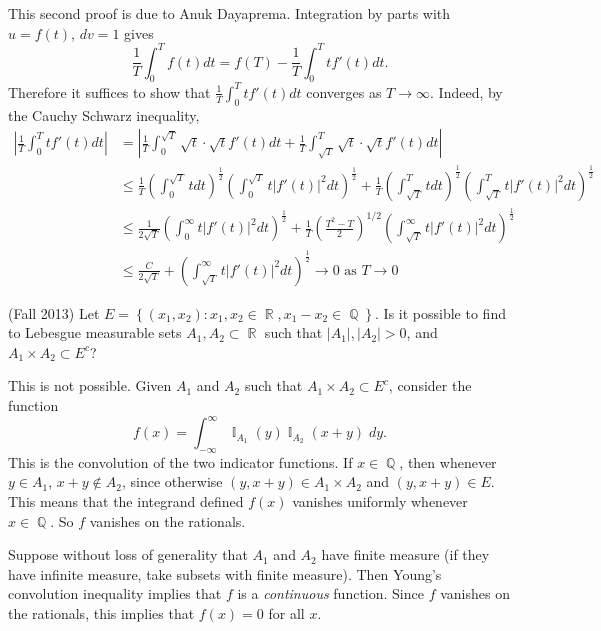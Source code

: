 \documentclass[answers]{exam}
\DeclareMathOperator{\RR}{\mathbb{R}}
\DeclareMathOperator{\QQ}{\mathbb{Q}}
\DeclareMathOperator{\II}{\mathbb{I}}
\begin{document}
\begin{questions}
\begin{solution}
    This second proof is due to Anuk Dayaprema. Integration by parts with $u=f(t)$, $dv=1$ gives
\begin{equation*}
  \frac{1}{T}\int_{0}^{T}f(t)dt = f(T) - \frac{1}{T}\int_{0}^{T}tf'(t)dt.
\end{equation*}
Therefore it suffices to show that $\frac{1}{T}\int_{0}^{T}tf'(t)dt$ converges as $T\to \infty$. Indeed, by the Cauchy Schwarz inequality,
\begin{align*}
  \left|\frac{1}{T}\int_{0}^{T}tf'(t)dt\right|
  &= \left|\frac{1}{T}\int_{0}^{\sqrt{T}}\sqrt{t}\cdot\sqrt{t}f'(t)dt + \frac{1}{T}\int_{\sqrt{T}}^{T}\sqrt{t}\cdot \sqrt{t}f'(t)dt\right|\\
  & \leq \frac{1}{T}\left(\int_{0}^{\sqrt{T}}t dt \right)^{\frac{1}{2}}\left( \int_{0}^{\sqrt{T}}t |f'(t)|^{2}dt \right)^{\frac{1}{2}}+ \frac{1}{T}\left( \int_{\sqrt{T}}^{T}tdt \right)^{\frac{1}{2}}\left( \int_{\sqrt{T}}^{T}t|f'(t)|^{2}dt \right)^{\frac{1}{2}}\\
  &\leq \frac{1}{2 \sqrt{T}} \left(\int_{0}^{\infty}t|f'(t)|^{2} dt \right)^{\frac{1}{2}} + \frac{1}{T}\left( \frac{T^{2}-T}{2} \right)^{1/2}\left(\int_{\sqrt{T}}^{\infty}t|f'(t)|^{2}dt \right)^{\frac{1}{2}}\\
  &\leq \frac{C}{2 \sqrt{T}}  +\left(\int_{\sqrt{T}}^{\infty} t|f'(t)|^{2}dt \right)^{\frac{1}{2}} \to 0 \text{ as }T\to 0
\end{align*}
\end{solution}



\question (Fall 2013) Let $E= \left\{ (x_{1},x_{2}) : x_{1},x_{2}\in \RR, x_{1}-x_{2}\in \QQ\right\}$. Is it possible to find to Lebesgue measurable sets $A_{1},A_{2}\subset\RR$ such that $|A_{1}|,|A_{2}|>0$, and $A_{1}\times A_{2}\subset E^{c}$?
\begin{solution}
	This is not possible. Given $A_1$ and $A_2$ such that $A_1 \times A_2 \subset E^c$, consider the function
	\[ f(x) = \int_{-\infty}^\infty \II_{A_1}(y) \II_{A_2}(x + y)\; dy. \] 
	This is the convolution of the two indicator functions. If $x \in \QQ$, then whenever $y \in A_1$, $x + y \not \in A_2$, since otherwise $(y,x + y) \in A_1 \times A_2$ and $(y,x+y) \in E$. This means that the integrand defined $f(x)$ vanishes uniformly whenever $x \in \QQ$. So $f$ vanishes on the rationals.

	Suppose without loss of generality that $A_1$ and $A_2$ have finite measure (if they have infinite measure, take subsets with finite measure). Then Young's convolution inequality implies that $f$ is a \emph{continuous} function. Since $f$ vanishes on the rationals, this implies that $f(x) = 0$ for all $x$.


\end{solution}
\end{questions}
\end{document}
